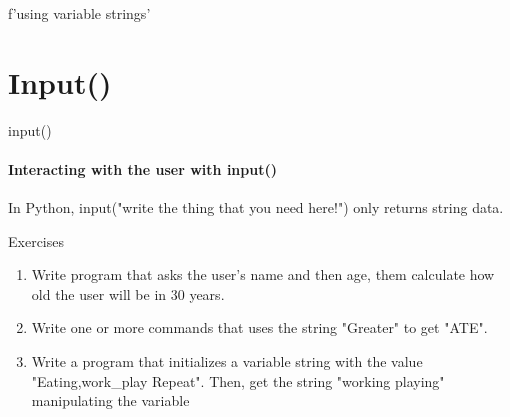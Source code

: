 \documentclass[aspectratio=169,19pt,english]{beamer}
\begin{document}
{\begin{frame}{f'using variable strings'}
		\end{frame}
		\section{Input()}
		\begin{frame}{input()}
			\framesubtitle{Interacting with the user with input()}
			In Python, input("write the thing that you need here!") only returns string data.
		\end{frame}
		\begin{frame}{Exercises}
			\begin{enumerate}[label=\arabic*.-]
				\item Write  program that asks the user's name and then age, them calculate how old the user will be in 30 years. 
				\item Write one or more commands that uses the string "Greater" to get "ATE".
				\item Write a program that initializes a variable string with the value "Eating,work\_play Repeat". Then, get the string "working playing" manipulating the variable 
			\end{enumerate}
			
		\end{frame}
	}
\end{document}
